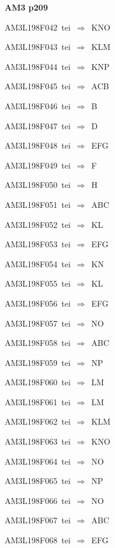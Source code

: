 \par\vfill\eject
{\bf\hfill AM3 p209\hfill\hbox{}}\par\bigskip
{\sixrm AM3L198F042\ {\sixit tei}\ }$\Rightarrow$\ KNO\par\smallskip
{\sixrm AM3L198F043\ {\sixit tei}\ }$\Rightarrow$\ KLM\par\smallskip
{\sixrm AM3L198F044\ {\sixit tei}\ }$\Rightarrow$\ KNP\par\smallskip
{\sixrm AM3L198F045\ {\sixit tei}\ }$\Rightarrow$\ ACB\par\smallskip
{\sixrm AM3L198F046\ {\sixit tei}\ }$\Rightarrow$\ B\par\smallskip
{\sixrm AM3L198F047\ {\sixit tei}\ }$\Rightarrow$\ D\par\smallskip
{\sixrm AM3L198F048\ {\sixit tei}\ }$\Rightarrow$\ EFG\par\smallskip
{\sixrm AM3L198F049\ {\sixit tei}\ }$\Rightarrow$\ F\par\smallskip
{\sixrm AM3L198F050\ {\sixit tei}\ }$\Rightarrow$\ H\par\smallskip
{\sixrm AM3L198F051\ {\sixit tei}\ }$\Rightarrow$\ ABC\par\smallskip
{\sixrm AM3L198F052\ {\sixit tei}\ }$\Rightarrow$\ KL\par\smallskip
{\sixrm AM3L198F053\ {\sixit tei}\ }$\Rightarrow$\ EFG\par\smallskip
{\sixrm AM3L198F054\ {\sixit tei}\ }$\Rightarrow$\ KN\par\smallskip
{\sixrm AM3L198F055\ {\sixit tei}\ }$\Rightarrow$\ KL\par\smallskip
{\sixrm AM3L198F056\ {\sixit tei}\ }$\Rightarrow$\ EFG\par\smallskip
{\sixrm AM3L198F057\ {\sixit tei}\ }$\Rightarrow$\ NO\par\smallskip
{\sixrm AM3L198F058\ {\sixit tei}\ }$\Rightarrow$\ ABC\par\smallskip
{\sixrm AM3L198F059\ {\sixit tei}\ }$\Rightarrow$\ NP\par\smallskip
{\sixrm AM3L198F060\ {\sixit tei}\ }$\Rightarrow$\ LM\par\smallskip
{\sixrm AM3L198F061\ {\sixit tei}\ }$\Rightarrow$\ LM\par\smallskip
{\sixrm AM3L198F062\ {\sixit tei}\ }$\Rightarrow$\ KLM\par\smallskip
{\sixrm AM3L198F063\ {\sixit tei}\ }$\Rightarrow$\ KNO\par\smallskip
{\sixrm AM3L198F064\ {\sixit tei}\ }$\Rightarrow$\ NO\par\smallskip
{\sixrm AM3L198F065\ {\sixit tei}\ }$\Rightarrow$\ NP\par\smallskip
{\sixrm AM3L198F066\ {\sixit tei}\ }$\Rightarrow$\ NO\par\smallskip
{\sixrm AM3L198F067\ {\sixit tei}\ }$\Rightarrow$\ ABC\par\smallskip
{\sixrm AM3L198F068\ {\sixit tei}\ }$\Rightarrow$\ EFG\par\smallskip

